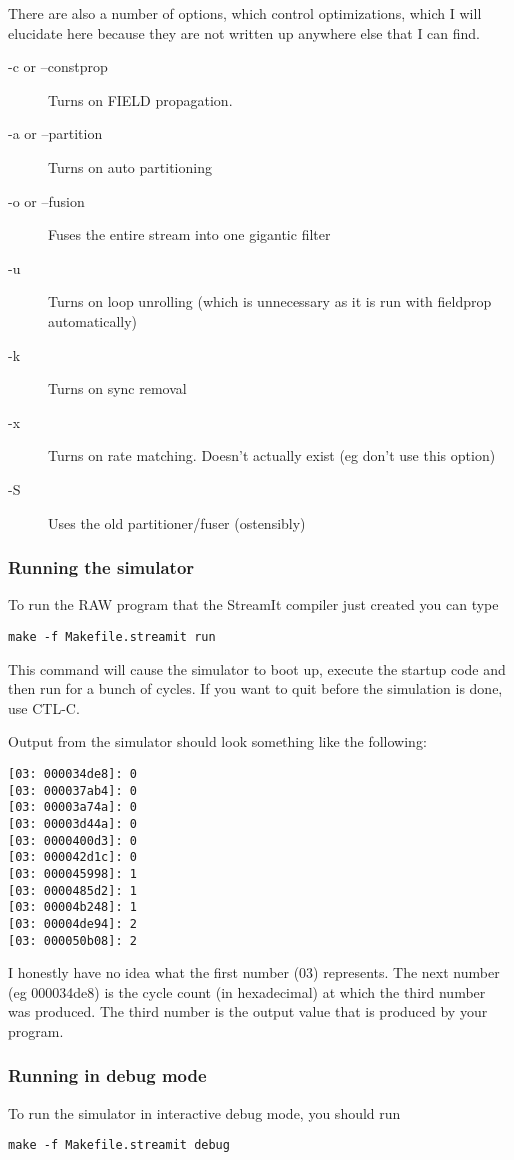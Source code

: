 There are also a number of options, which control optimizations,
which I will elucidate here because they are not written up anywhere
else that I can find.
\begin{description}
\item [-c or --constprop] Turns on FIELD propagation.
\item [-a or --partition] Turns on auto partitioning
\item [-o or --fusion] Fuses the entire stream into one gigantic filter
\item [-u] Turns on loop unrolling (which is unnecessary as it is run with fieldprop automatically)
\item [-k] Turns on sync removal
\item [-x] Turns on rate matching. Doesn't actually exist (eg don't use this option)
\item [-S] Uses the old partitioner/fuser (ostensibly)
\end{description}


\subsubsection{Running the simulator}
To run the RAW program that the StreamIt compiler just created
you can type 

\begin{verbatim}make -f Makefile.streamit run\end{verbatim}

This command will cause the simulator to boot up, execute the startup code
and then run for a bunch of cycles. If you want to quit before the 
simulation is done, use CTL-C. 

Output from the simulator should look something like the following:
\begin{verbatim}
[03: 000034de8]: 0
[03: 000037ab4]: 0
[03: 00003a74a]: 0
[03: 00003d44a]: 0
[03: 0000400d3]: 0
[03: 000042d1c]: 0
[03: 000045998]: 1
[03: 0000485d2]: 1
[03: 00004b248]: 1
[03: 00004de94]: 2
[03: 000050b08]: 2
\end{verbatim}

I honestly have no idea what the first number (03) represents. The next number 
(eg 000034de8) is the cycle count (in hexadecimal) at which the third number was produced. The 
third number is the output value that is produced by your program.

\subsubsection{Running in debug mode}
To run the simulator in interactive debug mode, you should run
\begin{verbatim}make -f Makefile.streamit debug\end{verbatim}

